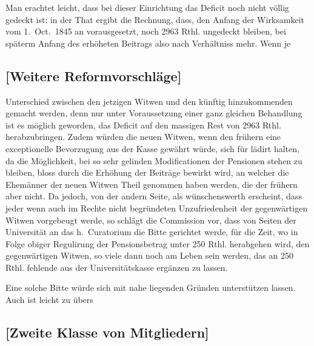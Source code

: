 \documentclass[12pt,a4paper]{article}
\begin{document}
Man erachtet leicht, dass bei dieser Einrichtung das Deficit noch nicht völlig gedeckt ist: in der That ergibt die Rechnung, dass, den Anfang der Wirksamkeit vom 1.~Oct.~1845 an vorausgesetzt, noch 2963 Rthl. ungedeckt bleiben, bei späterm Anfang des erhöheten Beitrags also nach Verhältniss mehr. Wenn je

\subsection*{[Weitere Reformvorschläge]}

Unterschied zwischen den jetzigen Witwen und den künftig hinzukommenden gemacht werden, denn nur unter Voraussetzung einer ganz gleichen Behandlung ist es möglich geworden, das Deficit auf den massigen Rest von 2963 Rthl. herabzubringen. Zudem würden die neuen Witwen, wenn den frühern eine exceptionelle Bevorzugung aus der Kasse gewährt würde, sich für lädirt halten, da die Möglichkeit, bei so sehr gelinden Modificationen der Pensionen stehen zu bleiben, bloss durch die Erhöhung der Beiträge bewirkt wird, an welcher die Ehemänner der neuen Witwen Theil genommen haben werden, die der frühern aber nicht. Da jedoch, von der andern Seite, als wünschenswerth erscheint, dass jeder wenn auch im Rechte nicht begründeten Unzufriedenheit der gegenwärtigen Witwen vorgebeugt werde, so schlägt die Commission vor, dass von Seiten der Universität an das h.~Curatorium die Bitte gerichtet werde, für die Zeit, wo in Folge obiger Regulirung der Pensionsbetrag unter 250 Rthl. herabgehen wird, den gegenwärtigen Witwen, so viele dann noch am Leben sein werden, das an 250 Rthl. fehlende aus der Universitätskasse ergänzen zu lassen.

Eine solche Bitte würde sich mit nahe liegenden Gründen unterstützen lassen. Auch ist leicht zu übers

\subsection*{[Zweite Klasse von Mitgliedern]}
\end{document}

